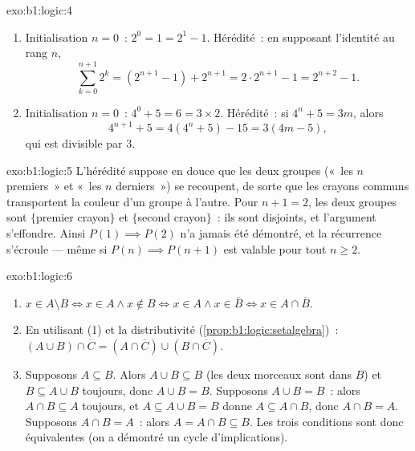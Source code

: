 \begin{solution}{exo:b1:logic:4}
\begin{enumerate}
  \item Initialisation $n = 0$~: $2^0 = 1 = 2^1 - 1$. Hérédité~: en
        supposant l'identité au rang $n$,
        \[
        \sum_{k=0}^{n+1} 2^k = (2^{n+1} - 1) + 2^{n+1}
        = 2 \cdot 2^{n+1} - 1 = 2^{n+2} - 1 .
        \]
  \item Initialisation $n = 0$~: $4^0 + 5 = 6 = 3 \times 2$. Hérédité~:
        si $4^n + 5 = 3m$, alors
        \[
        4^{n+1} + 5 = 4(4^n + 5) - 15 = 3(4m - 5),
        \]
        qui est divisible par $3$.
\end{enumerate}
\end{solution}

\begin{solution}{exo:b1:logic:5}
L'hérédité suppose en douce que les deux groupes («~les $n$ premiers~»
et «~les $n$ derniers~») se recoupent, de sorte que les crayons communs
transportent la couleur d'un groupe à l'autre. Pour $n + 1 = 2$, les
deux groupes sont $\{$premier crayon$\}$ et $\{$second crayon$\}$~: ils
sont disjoints, et l'argument s'effondre. Ainsi $P(1) \implies P(2)$ n'a
jamais été démontré, et la récurrence s'écroule --- même si
$P(n) \implies P(n+1)$ est valable pour tout $n \geq 2$.
\end{solution}

\begin{solution}{exo:b1:logic:6}
\begin{enumerate}
  \item $x \in A \setminus B \iff x \in A \land x \notin B \iff x \in
        A \land x \in \overline{B} \iff x \in A \cap \overline{B}$.
  \item En utilisant (1) et la distributivité
        (\cref{prop:b1:logic:setalgebra})~:
        $(A \cup B) \cap \overline{C} = (A \cap \overline{C}) \cup
        (B \cap \overline{C})$.
  \item Supposons $A \subseteq B$. Alors $A \cup B \subseteq B$ (les
        deux morceaux sont dans $B$) et $B \subseteq A \cup B$ toujours,
        donc $A \cup B = B$. Supposons $A \cup B = B$~: alors $A \cap B
        \subseteq A$ toujours, et $A \subseteq A \cup B = B$ donne
        $A \subseteq A \cap B$, donc $A \cap B = A$. Supposons
        $A \cap B = A$~: alors $A = A \cap B \subseteq B$. Les trois
        conditions sont donc équivalentes (on a démontré un cycle
        d'implications).
\end{enumerate}
\end{solution}

